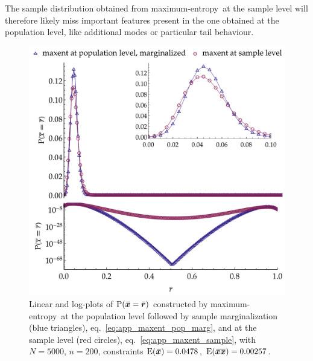 \documentclass{article}
\theoremstyle{remark}
\theoremstyle{innote}
\renewcommand*{\|}{\mathpunct{|}}%
\newcommand*{\p}{\mathrm{P}}%
\newcommand*{\eqn}{eq.}%
\newcommand*{\E}{\mathrm{E}}
\DeclarePairedDelimiter\expp{(}{)}
\newcommand*{\expe}{\E\expp}%
\theoremstyle{simple}
\newcommand*{\widebar}[1]{{\mkern1.5mu\skew{2}\overline{\mkern-1.5mu#1\mkern-1.5mu}\mkern 1.5mu}}
\newcommand*{\sav}{\widebar} %
\newcommand*{\yxx}{x}%
\newcommand*{\yx}{\bm{\yxx}}%
\newcommand*{\yxs}{\sav{\yx}}%
\newcommand*{\yxxs}{\sav{\yx\yx}}%
\newcommand*{\yr}{\bm{r}}%
\newcommand*{\yrs}{\sav{\yr}}%
\newcommand*{\me}{maximum-entropy}
\begin{document}
The sample distribution obtained from \me\ at the sample level will
therefore likely miss important features present in the one obtained at the
population level, like additional modes or particular tail behaviour.
\begin{figure}[!t]
\centering
\includegraphics[width=0.9\linewidth]{different_maxent_pop_sample_200_realdata_2mom.pdf}%
\caption{Linear and log-plots of $\p(\yxs = \yrs)$ constructed by \me\ at the population
  level followed by sample marginalization (blue triangles),
  \eqn~\eqref{eq:app_maxent_pop_marg}, and at the sample level (red
  circles), \eqn~\eqref{eq:app_maxent_sample}, with $N=5000$,
  $n=200$, constraints $\expe{\yxs}=0.0478$, $\expe{\yxxs}=0.00257$.}
\label{fig:diff_maxent_pop_sample}
\end{figure}%
\end{document}
